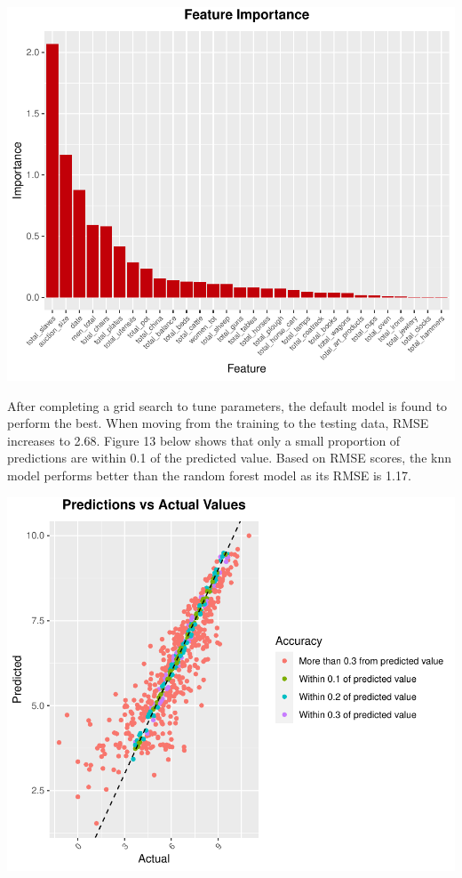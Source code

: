 \documentclass[11pt,preprint, authoryear]{elsarticle}
\numberwithin{equation}{section}
\numberwithin{figure}{section}
\numberwithin{table}{section}
\begin{document}
\includegraphics{Project_write_up_files/figure-latex/Figure12, -1.pdf}

After completing a grid search to tune parameters, the default model is
found to perform the best. When moving from the training to the testing
data, RMSE increases to 2.68. Figure 13 below shows that only a small
proportion of predictions are within 0.1 of the predicted value. Based
on RMSE scores, the knn model performs better than the random forest
model as its RMSE is 1.17.

\includegraphics{Project_write_up_files/figure-latex/Figure13-1.pdf}
\end{document}
